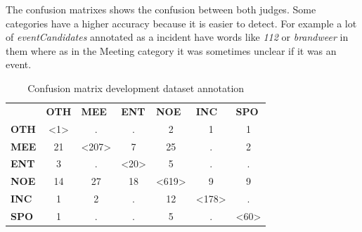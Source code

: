 \documentclass[
10pt, %
a4paper, %
oneside, %
headinclude,footinclude, %
BCOR5mm, %
]{scrartcl}
\begin{document}
\noindent The confusion matrixes shows the confusion between both judges. Some categories have a higher accuracy because it is easier to detect. For example a lot of \textit{eventCandidates} annotated as a incident have words like \textit{112} or \textit{brandweer} in them where as in the Meeting category it was sometimes unclear if it was an event. 
\begin{table}[h]
 \centering
\caption[Confusion matrix testset annotation]{Confusion matrix development dataset annotation }
\begin{tabular}{lcccccc}
 & \multicolumn{1}{l}{\textbf{OTH}} & \multicolumn{1}{l}{\textbf{MEE}} & \multicolumn{1}{l}{\textbf{ENT}} & \multicolumn{1}{l}{\textbf{NOE}} & \multicolumn{1}{l}{\textbf{INC}} & \multicolumn{1}{l}{\textbf{SPO}} \\ \cline{2-7} 
\multicolumn{1}{l|}{\textbf{OTH}} & \multicolumn{1}{c|}{\textless1\textgreater} & \multicolumn{1}{c|}{.} & \multicolumn{1}{c|}{.} & \multicolumn{1}{c|}{2} & \multicolumn{1}{c|}{1} & \multicolumn{1}{c|}{1} \\ \cline{2-7} 
\multicolumn{1}{l|}{\textbf{MEE}} & \multicolumn{1}{c|}{21} & \multicolumn{1}{c|}{\textless207\textgreater} & \multicolumn{1}{c|}{7} & \multicolumn{1}{c|}{25} & \multicolumn{1}{c|}{.} & \multicolumn{1}{c|}{2} \\ \cline{2-7} 
\multicolumn{1}{l|}{\textbf{ENT}} & \multicolumn{1}{c|}{3} & \multicolumn{1}{c|}{.} & \multicolumn{1}{c|}{\textless20\textgreater} & \multicolumn{1}{c|}{5} & \multicolumn{1}{c|}{.} & \multicolumn{1}{c|}{.} \\ \cline{2-7} 
\multicolumn{1}{l|}{\textbf{NOE}} & \multicolumn{1}{c|}{14} & \multicolumn{1}{c|}{27} & \multicolumn{1}{c|}{18} & \multicolumn{1}{c|}{\textless619\textgreater} & \multicolumn{1}{c|}{9} & \multicolumn{1}{c|}{9} \\ \cline{2-7} 
\multicolumn{1}{l|}{\textbf{INC}} & \multicolumn{1}{c|}{1} & \multicolumn{1}{c|}{2} & \multicolumn{1}{c|}{.} & \multicolumn{1}{c|}{12} & \multicolumn{1}{c|}{\textless178\textgreater} & \multicolumn{1}{c|}{.} \\ \cline{2-7} 
\multicolumn{1}{l|}{\textbf{SPO}} & \multicolumn{1}{c|}{1} & \multicolumn{1}{c|}{.} & \multicolumn{1}{c|}{.} & \multicolumn{1}{c|}{5} & \multicolumn{1}{c|}{.} & \multicolumn{1}{c|}{\textless60\textgreater} \\ \cline{2-7} 
\end{tabular}
\end{table}
\end{document}
